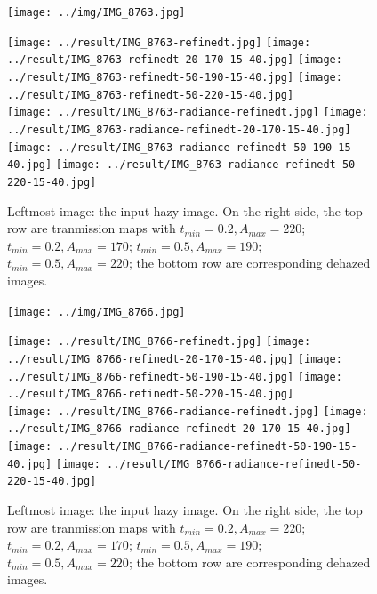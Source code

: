 \documentclass{article}
\begin{document}
\begin{figure}[htp]
    \centering
    \begin{minipage}[b]{0.319\linewidth}
        \centering
        \texttt{[image: ../img/IMG\_8763.jpg]}
    \end{minipage}
    \begin{minipage}[b]{0.66\linewidth}
       \centering
        \texttt{[image: ../result/IMG\_8763-refinedt.jpg]}
        \texttt{[image: ../result/IMG\_8763-refinedt-20-170-15-40.jpg]}
        \texttt{[image: ../result/IMG\_8763-refinedt-50-190-15-40.jpg]}
        \texttt{[image: ../result/IMG\_8763-refinedt-50-220-15-40.jpg]}
        \\
        \texttt{[image: ../result/IMG\_8763-radiance-refinedt.jpg]}
        \texttt{[image: ../result/IMG\_8763-radiance-refinedt-20-170-15-40.jpg]}
        \texttt{[image: ../result/IMG\_8763-radiance-refinedt-50-190-15-40.jpg]}
        \texttt{[image: ../result/IMG\_8763-radiance-refinedt-50-220-15-40.jpg]}
    \end{minipage}
    
    \captionsetup{singlelinecheck=off}
    \caption{Leftmost image: the input hazy image. On the right side, the top row are tranmission maps with
        $t_{min} = 0.2, A_{max} = 220$;
        $t_{min} = 0.2, A_{max} = 170$;
        $t_{min} = 0.5, A_{max} = 190$;
        $t_{min} = 0.5, A_{max} = 220$;
        the bottom row are corresponding dehazed images.
    }
    \label{fig:sp1}
\end{figure}

\begin{figure}[h]
    \centering
    \begin{minipage}[b]{0.319\linewidth}
        \centering
        \texttt{[image: ../img/IMG\_8766.jpg]}
    \end{minipage}
    \begin{minipage}[b]{0.66\linewidth}
       \centering
        \texttt{[image: ../result/IMG\_8766-refinedt.jpg]}
        \texttt{[image: ../result/IMG\_8766-refinedt-20-170-15-40.jpg]}
        \texttt{[image: ../result/IMG\_8766-refinedt-50-190-15-40.jpg]}
        \texttt{[image: ../result/IMG\_8766-refinedt-50-220-15-40.jpg]}
        \\
        \texttt{[image: ../result/IMG\_8766-radiance-refinedt.jpg]}
        \texttt{[image: ../result/IMG\_8766-radiance-refinedt-20-170-15-40.jpg]}
        \texttt{[image: ../result/IMG\_8766-radiance-refinedt-50-190-15-40.jpg]}
        \texttt{[image: ../result/IMG\_8766-radiance-refinedt-50-220-15-40.jpg]}
    \end{minipage}
    
    \captionsetup{singlelinecheck=off}
    \caption{Leftmost image: the input hazy image. On the right side, the top row are tranmission maps with
        $t_{min} = 0.2, A_{max} = 220$;
        $t_{min} = 0.2, A_{max} = 170$;
        $t_{min} = 0.5, A_{max} = 190$;
        $t_{min} = 0.5, A_{max} = 220$;
        the bottom row are corresponding dehazed images.
    }
    \label{fig:sp2}
\end{figure}
\end{document}
